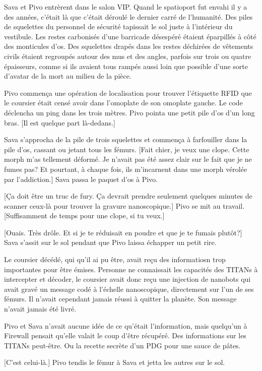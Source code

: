 Sava et Pivo entrèrent dans le salon VIP. Quand le spatioport fut envahi il y a des années, c'était là que c'était déroulé le dernier carré de l'humanité. Des piles de squelettes du personnel de sécurité tapissait le sol juste à l'intérieur du vestibule. Les restes carbonisés d'une barricade désespéré étaient éparpillés à côté des monticules d'os. Des squelettes drapés dans les restes déchirées de vêtements civils étaient regroupés autour des mus et des angles, parfois sur trois ou quatre épaisseurs, comme si ils avaient tous rampés aussi loin que possible d'une sorte d'avatar de la mort au milieu de la pièce. 

Pivo commença une opération de localisation pour trouver l'étiquette RFID que le coursier était censé avoir dans l'omoplate de son omoplate gauche. Le code déclencha un ping dans les trois mètres. Pivo pointa une petit pile d'os d'un long bras. [Il est quelque part là-dedans.] 

Sava s'approcha de la pile de trois squelettes et commença à farfouiller dans la pile d'os, cassant ou jetant tous les fémurs. [Fait chier, je veux une clope. Cette morph m'as tellement déformé. Je n'avait pas été assez clair sur le fait que je ne fumes pas? Et pourtant, à chaque fois, ils m'incarnent dans une morph vérolée par l'addiction.] Sava passa le paquet d'os à Pivo. 

[Ça doit être un truc de fury. Ça devrait prendre seulement quelques minutes de scanner ceux-là pour trouver la gravure nanoscopique.] Pivo se mit au travail. [Suffisamment de temps pour une clope, si tu veux.] 

[Ouais. Très drôle. Et si je te réduisait en poudre et que je te fumais plutôt?] Sava s'assit sur le sol pendant que Pivo laissa échapper un petit rire. 

Le coursier décédé, qui qu'il ai pu être, avait reçu des informatiosn trop importantes pour être émises. Personne ne connaissait les capacités des TITANs à intercepter et décoder, le coursier avait donc reçu une injection de nanobots qui avait gravé un message codé à l'échelle nanoscopique, directement sur l'un de ses fémurs. Il n'avait cependant jamais réussi à quitter la planète. Son message n'avait jamais été livré. 

Pivo et Sava n'avait aucune idée de ce qu'était l'information, mais quelqu'un à Firewall  pensait qu'elle valait le coup d'être récupéré. Des informations sur les TITANs peut-être. Ou la recette secrète d'un PDG pour une sauce de pâtes. 

[C'est celui-là.] Pivo tendis le fémur à Sava et jetta les autres sur le sol. 

